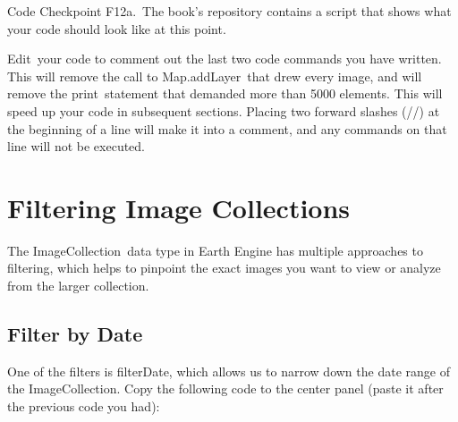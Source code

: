 \documentclass[
  letterpaper,
  DIV=11,
  numbers=noendperiod]{scrreprt}
\begin{document}
\begin{tcolorbox}[enhanced jigsaw, left=2mm, breakable, rightrule=.15mm, opacityback=0, colframe=quarto-callout-note-color-frame, colbacktitle=quarto-callout-note-color!10!white, arc=.35mm, opacitybacktitle=0.6, toptitle=1mm, colback=white, leftrule=.75mm, title=\textcolor{quarto-callout-note-color}{\faInfo}\hspace{0.5em}{Note}, toprule=.15mm, bottomtitle=1mm, titlerule=0mm, bottomrule=.15mm, coltitle=black]

Code Checkpoint F12a.~The book's repository contains a script that shows
what your code should look like at this point.

\end{tcolorbox}

Edit~your code to comment out the last two code commands you have
written. This will remove the call to Map.addLayer~that drew every
image, and will remove the print~statement that demanded more than 5000
elements. This will speed up your code in subsequent sections. Placing
two forward slashes (//) at the beginning of a line will make it into a
comment, and any commands on that line will not be executed.

\hypertarget{filtering-image-collections}{%
\section{Filtering Image
Collections}\label{filtering-image-collections}}

The ImageCollection~data type in Earth Engine has multiple approaches to
filtering, which helps to pinpoint the exact images you want to view or
analyze from the larger collection.

\hypertarget{filter-by-date}{%
\subsection{Filter by Date}\label{filter-by-date}}

One of the filters is filterDate, which allows us to narrow down the
date range of the ImageCollection. Copy the following code to the center
panel (paste it after the previous code you had):
\end{document}
